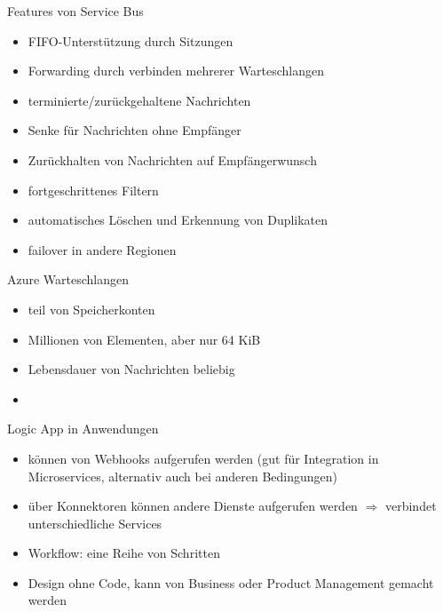 \begin{flashcard}[]{Features von Service Bus}
  \begin{itemize}
    \item FIFO-Unterstützung durch Sitzungen
    \item Forwarding durch verbinden mehrerer Warteschlangen
    \item terminierte/zurückgehaltene Nachrichten
    \item Senke für Nachrichten ohne Empfänger
    \item Zurückhalten von Nachrichten auf Empfängerwunsch
    \item fortgeschrittenes Filtern
    \item automatisches Löschen und Erkennung von Duplikaten
    \item failover in andere Regionen
  \end{itemize}
\end{flashcard}

\begin{flashcard}[]{Azure Warteschlangen}
  \begin{itemize}
    \item teil von Speicherkonten
    \item Millionen von Elementen, aber nur 64 KiB
    \item Lebensdauer von Nachrichten beliebig
    \item 
  \end{itemize}
\end{flashcard}

\begin{flashcard}[]{Logic App in Anwendungen}
  \begin{itemize}
    \item können von Webhooks aufgerufen werden (gut für Integration in Microservices, alternativ auch bei anderen Bedingungen)
    \item über Konnektoren können andere Dienste aufgerufen werden
      $\Rightarrow$ verbindet unterschiedliche Services
    \item Workflow: eine Reihe von Schritten
    \item Design ohne Code, kann von Business oder Product Management gemacht werden
  \end{itemize}
\end{flashcard}

